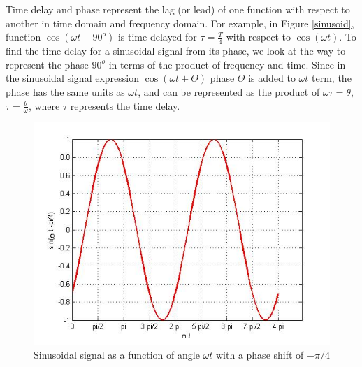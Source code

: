 \documentclass{ximera}
\begin{document}
\begin{definition}
Time delay and phase represent the lag (or lead) of one function with respect to another in time domain and frequency domain. For example, in Figure \ref{sinusoid}, function $ \cos(\omega t - 90^o)$ is time-delayed for $\tau = \frac{T}{4}$ with respect to $\cos (\omega t)$. To find the time delay for a sinusoidal signal from its phase, we look at the way to represent the phase $90^o$ in terms of the product of frequency and time. Since in the sinusoidal signal expression $\cos (\omega t + \Theta)$  phase $\Theta$ is added to $\omega t$ term, the phase has the same units as $\omega t$, and can be represented as the product of $\omega \tau = \theta$, $\tau = \frac{\theta}{\omega}$, where $\tau$ represents the time delay.
\end{definition}









\begin{figure} [htbp]
\includegraphics[scale=0.4]{jpg/cpef4.jpg}
\caption{Sinusoidal signal as a function of angle $\omega t$ with a phase shift of $-\pi/4$}
\label{sinMinus45Ph}
\end{figure}
\end{document}
